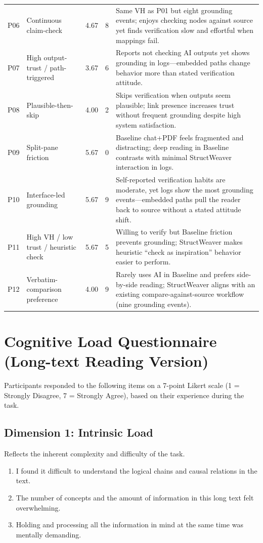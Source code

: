 \documentclass[manuscript,review,anonymous]{acmart}
\begin{document}
\begin{table}[t]
\begin{tabularx}{\linewidth}{l l c c X}
P06 & Continuous claim-check & 4.67 & 8 & Same VH as P01 but eight grounding events; enjoys checking nodes against source yet finds verification slow and effortful when mappings fail. \\
P07 & High output-trust / path-triggered & 3.67 & 6 & Reports not checking AI outputs yet shows grounding in logs---embedded paths change behavior more than stated verification attitude. \\
P08 & Plausible-then-skip & 4.00 & 2 & Skips verification when outputs seem plausible; link presence increases trust without frequent grounding despite high system satisfaction. \\
P09 & Split-pane friction & 5.67 & 0 & Baseline chat+PDF feels fragmented and distracting; deep reading in Baseline contrasts with minimal StructWeaver interaction in logs. \\
P10 & Interface-led grounding & 5.67 & 9 & Self-reported verification habits are moderate, yet logs show the most grounding events---embedded paths pull the reader back to source without a stated attitude shift. \\
P11 & High VH / low trust / heuristic check & 5.67 & 5 & Willing to verify but Baseline friction prevents grounding; StructWeaver makes heuristic ``check as inspiration'' behavior easier to perform. \\
P12 & Verbatim-comparison preference & 4.00 & 9 & Rarely uses AI in Baseline and prefers side-by-side reading; StructWeaver aligns with an existing compare-against-source workflow (nine grounding events). \\
\bottomrule
\end{tabularx}
\end{table}

\section{Cognitive Load Questionnaire (Long-text Reading Version)}

Participants responded to the following items on a 7-point Likert scale 
(1 = Strongly Disagree, 7 = Strongly Agree), based on their experience during the task.

\subsection*{Dimension 1: Intrinsic Load}
Reflects the inherent complexity and difficulty of the task.
\begin{enumerate}[label=\arabic*.]
 \item I found it difficult to understand the logical chains and causal relations in the text.
 \item The number of concepts and the amount of information in this long text felt overwhelming.
 \item Holding and processing all the information in mind at the same time was mentally demanding.
\end{enumerate}
\end{document}
